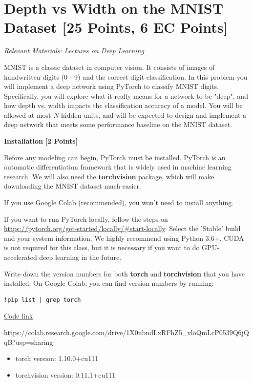 \newpage
\section{Depth vs Width on the MNIST Dataset  [25 Points, 6 EC Points]}

\textit{Relevant Materials: Lectures on Deep Learning}

MNIST is a classic dataset in computer vision. It consists of images of handwritten digits (0 - 9) and the correct digit classification. In this problem you will implement a deep network using PyTorch to classify MNIST digits. Specifically, you will explore what it really means for a network to be "deep", and how depth vs. width impacts the classification accuracy of a model. You will be allowed at most $N$ hidden units, and will be expected to design and implement a deep network that meets some performance baseline on the MNIST dataset.

\medskip

\problem \textbf{Installation} \textbf{[2 Points]}


Before any modeling can begin, PyTorch must be installed. PyTorch is an automatic differentiation framework that is widely used in machine learning research.  We will also need the \textbf{torchvision} package, which will make downloading the MNIST dataset much easier. 

If you use Google Colab (recommended), you won't need to install anything.

If you want to run PyTorch locally, follow the steps on \\
\url{https://pytorch.org/get-started/locally/#start-locally}. Select the 'Stable' build and your system information. We highly recommend using Python 3.6+. CUDA is not required for this class, but it is necessary if you want to do GPU-accelerated deep learning in the future.

Write down the version numbers for both \textbf{torch} and \textbf{torchvision} that you have installed. On Google Colab, you can find version numbers by running: \begin{verbatim}!pip list | grep torch\end{verbatim}

\begin{solution}
    \href{https://colab.research.google.com/drive/1X0ubndLxRFhZ5_vloQmLcP0539Q6jQqB?usp=sharing}{Code link}

    https://colab.research.google.com/drive/1X0ubndLxRFhZ5_vloQmLcP0539Q6jQqB?usp=sharing

    \begin{itemize}
        \item torch version: 1.10.0+cu111
        \item torchvision version: 0.11.1+cu111
    \end{itemize}
\end{solution}


